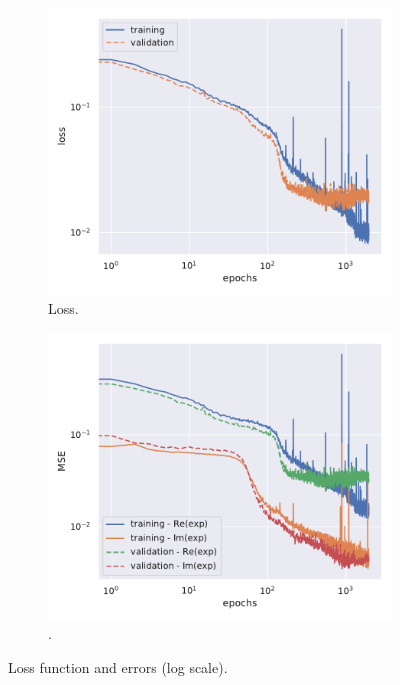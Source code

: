 \begin{figure}[htbp]
  \centering
  \begin{subfigure}{0.45\textwidth}
    \centering
    \includegraphics[width=\linewidth]{img/loss}
    \caption{Loss.}
  \end{subfigure}
  \begin{subfigure}{0.45\textwidth}
    \centering
    \includegraphics[width=\linewidth]{img/mse}
    \caption{\mse.}
  \end{subfigure}
  \caption{Loss function and errors (log scale).}
  \label{fig:agg:err}
\end{figure}


